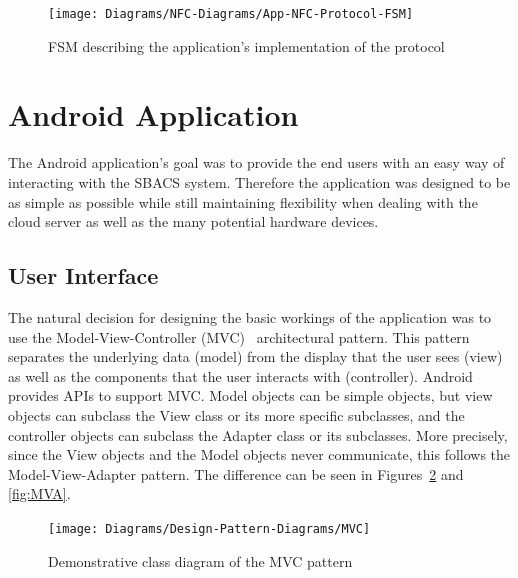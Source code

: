 \documentclass[12pt]{report}
\let\Oldsection\section
\renewcommand{\section}{\FloatBarrier\Oldsection}
\let\Oldsubsection\subsection
\renewcommand{\subsection}{\FloatBarrier\Oldsubsection}
\begin{document}
\begin{figure}
    \texttt{[image: Diagrams/NFC-Diagrams/App-NFC-Protocol-FSM]}
    \caption{FSM describing the application's implementation of the protocol}
    \label{fig:nfc-protocol-fsm-app}
\end{figure}


\section{Android Application} \label{android-application}

The Android application's goal was to provide the end users with an easy way of interacting with the SBACS system.
Therefore the application was designed to be as simple as possible while still maintaining flexibility when dealing with
the cloud server as well as the many potential hardware devices.


\subsection{User Interface} \label{user-interface}

The natural decision for designing the basic workings of the application was to use the Model-View-Controller (MVC)~\autocite{MVC} 
architectural pattern. This pattern separates the underlying data (model) from the display that the user sees (view) as well as
the components that the user interacts with (controller). Android provides APIs to support MVC. Model objects can be
simple objects, but view objects can subclass the View class or its more specific subclasses, and the controller
objects can subclass the Adapter class or its subclasses. More precisely, since the View objects and the Model objects
never communicate, this follows the Model-View-Adapter pattern. The difference can be seen in Figures~\ref{fig:MVC} and
\ref{fig:MVA}.


\begin{figure}
    \centering
    \texttt{[image: Diagrams/Design-Pattern-Diagrams/MVC]}
    \caption{Demonstrative class diagram of the MVC pattern}
    \label{fig:MVC}
\end{figure}
\end{document}
